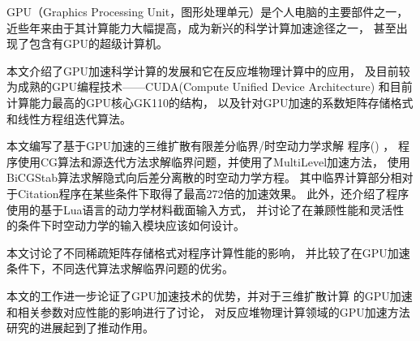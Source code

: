 






\begin{cabstract}
GPU（Graphics Processing Unit，图形处理单元）是个人电脑的主要部件之一，
近些年来由于其计算能力大幅提高，成为新兴的科学计算加速途径之一，
甚至出现了包含有GPU的超级计算机。

本文介绍了GPU加速科学计算的发展和它在反应堆物理计算中的应用，
及目前较为成熟的GPU编程技术——CUDA(Compute Unified Device Architecture)
和目前计算能力最高的GPU核心GK110的结构，
以及针对GPU加速的系数矩阵存储格式和线性方程组迭代算法。

本文编写了基于GPU加速的三维扩散有限差分临界/时空动力学求解
程序\ProgramName(\ProgramFullName) ，
程序使用CG算法和源迭代方法求解临界问题，并使用了MultiLevel加速方法，
使用BiCGStab算法求解隐式向后差分离散的时空动力学方程。
其中临界计算部分相对于Citation程序在某些条件下取得了最高272倍的加速效果。
此外，还介绍了\ProgramName 程序使用的基于Lua语言的动力学材料截面输入方式，
并讨论了在兼顾性能和灵活性的条件下时空动力学的输入模块应该如何设计。

本文讨论了不同稀疏矩阵存储格式对程序计算性能的影响，
并比较了在GPU加速条件下，不同迭代算法求解临界问题的优劣。

本文的工作进一步论证了GPU加速技术的优势，并对于三维扩散计算
的GPU加速和相关参数对应性能的影响进行了讨论，
对反应堆物理计算领域的GPU加速方法研究的进展起到了推动作用。

\end{cabstract}

